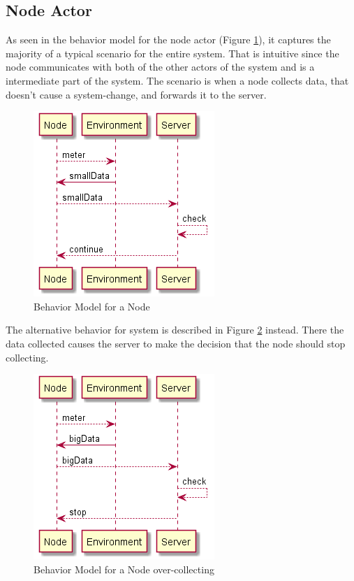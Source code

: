 \subsection{Node Actor}

As seen in the behavior model for the node actor (Figure \ref{fig:node_behav_smallData}), it captures the majority of a typical scenario for the entire system. That is intuitive since the node communicates with both of the other actors of the system and is a intermediate part of the system. The scenario is when a node collects data, that doesn't cause a system-change, and forwards it to the server.

\begin{figure}[ht]
    \includegraphics[scale=1]{include/figures/node_behav_smallData}
    \caption{Behavior Model for a Node}
    \label{fig:node_behav_smallData}
\end{figure}

The alternative behavior for system is described in Figure \ref{fig:node_behav_bigData} instead. There the data collected causes the server to make the decision that the node should stop collecting.

\begin{figure}[ht]
    \includegraphics[scale=1]{include/figures/node_behav_bigData}
    \caption{Behavior Model for a Node over-collecting}
    \label{fig:node_behav_bigData}
\end{figure}


